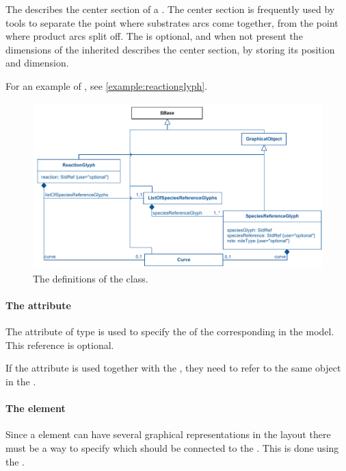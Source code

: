 The \Curve describes the center section of a \ReactionGlyph. The center 
section is frequently used by tools to separate the point where 
substrates arcs come together, from the point where product arcs split 
off. The \Curve is optional, and when not present the dimensions of the 
inherited \BoundingBox describes the center section, by storing its 
position and dimension. 

For an example of \ReactionGlyph, see \ref{example:reactionglyph}. 


\begin{figure}[!ht]
\includegraphics[scale=0.9]{uml/layout-reactionglyph-model-uml}
\caption{The definitions of the \ReactionGlyph class.}
\label{uml:reactionglyph}
\end{figure}

\paragraph{The  attribute}
The  attribute of type  is used to 
specify the  of the corresponding \Reaction in the model. This 
reference is optional. 

If the  attribute is used together with the , 
they need to refer to the same object in the \Model.

\paragraph {The  element}
\label{listofspeciesreferenceglyphs-class}
Since a \Species element can have several graphical representations in 
the layout there must be a way to specify which \SpeciesGlyph should be 
connected to the \ReactionGlyph. This is done using the 
. 

